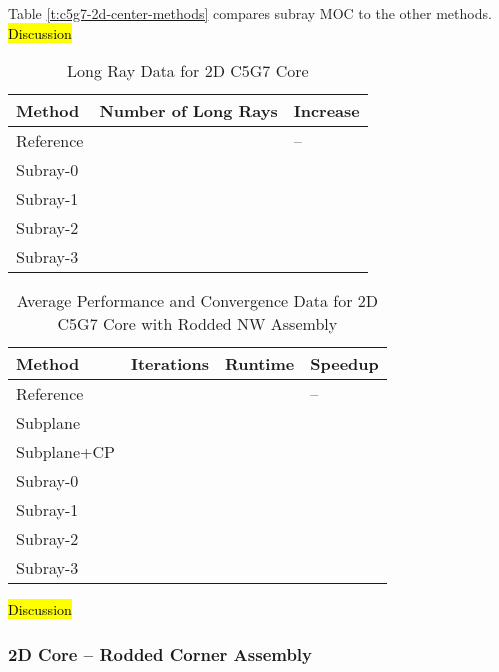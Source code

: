 Table \ref{t:c5g7-2d-center-methods} compares subray MOC to the other methods. \hl{Discussion}

\begin{table}[h]
    \centering
    \caption{Long Ray Data for 2D C5G7 Core}\label{t:subray-data-2dcore}
    \begin{tabular}{l l l }\toprule
        Method & Number of Long Rays & Increase \\\midrule
        Reference &  & -- \\
        Subray-0 &  &  \\
        Subray-1 &  &  \\
        Subray-2 &  &  \\
        Subray-3 &  &  \\
        \bottomrule
    \end{tabular}
\end{table}

\begin{table}[h]
    \centering
    \caption{Average Performance and Convergence Data for 2D C5G7 Core with Rodded NW Assembly}\label{t:subray-performance-2dcoreNW}
    \begin{tabular}{l l l l}\toprule
        Method & Iterations & Runtime & Speedup \\\midrule
        Reference &  &  & -- \\
        Subplane &  &  &  \\
        Subplane+CP &  &  &  \\
        Subray-0 &  &  &  \\
        Subray-1 &  &  &  \\
        Subray-2 &  &  &  \\
        Subray-3 &  &  &  \\
        \bottomrule
    \end{tabular}
\end{table}

\hl{Discussion}

\subsubsection{2D Core -- Rodded Corner Assembly}

